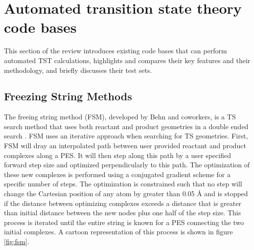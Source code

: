 \documentclass[preprint, 11pt]{elsarticle} %
\begin{document}


\section{Automated transition state theory code bases}

This section of the review introduces existing code bases that can perform automated TST calculations, highlights and compares their key features and their methodology, and briefly discusses their test sets.



\subsection{Freezing String Methods}

The freeing string method (FSM), developed by Behn and coworkers, is a TS search method that uses both reactant and product geometries in a double ended search \cite{Behn:2011}.
FSM uses an iterative approach when searching for TS geometries. 
First, FSM will dray an interpolated path between user provided reactant and product complexes along a PES.
It will then step along this path by a user specified forward step size and optimized perpendicularly to this path. 
The optimization of these new complexes is performed using a conjugated gradient scheme for a specific number of steps. 
The optimization is constrained such that no step will change the Cartesian position of any atom by greater than 0.05 \si{\angstrom} and is stopped if the distance between optimizing complexes exceeds a distance that is greater than initial distance between the new nodes plus one half of the step size. 
This process is iterated until the entire string is known for a PES connecting the two initial complexes. 
A cartoon representation of this process is shown in figure \ref{fig:fsm}. 
\end{document}
